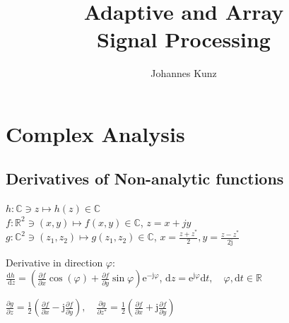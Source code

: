 \documentclass[english]{latex4ei/latex4ei_sheet}
\title{Adaptive and Array\\ Signal Processing}
\author{Johannes Kunz}					%
\begin{document}
\ifdefined\GitRevision{}\fi
\maketitle   %


\section{Complex Analysis}
\begin{sectionbox}
\subsection{Derivatives of Non-analytic functions}
\begin{emphbox}
  $h: \mathbb{C} \ni z \mapsto h(z) \in \mathbb{C}$\\
  $f: \mathbb{R}^{2} \ni(x, y) \mapsto f(x, y) \in \mathbb{C}$, $z=x+jy$\\
  $g: \mathbb{C}^{2} \ni\left(z_{1}, z_{2}\right) \mapsto g\left(z_{1}, z_{2}\right) \in \mathbb{C}$, $x=\frac{z+z^{*}}{2}, y=\frac{z-z^{*}}{2 \mathrm{j}}$
\end{emphbox}
Derivative in direction $\varphi$:\\
$\frac{\mathrm{d} h}{\mathrm{~d} z}=\left(\frac{\partial f}{\partial x} \cos (\varphi)+\frac{\partial f}{\partial y} \sin \varphi\right) \mathrm{e}^{-\mathrm{j} \varphi}$, $\mathrm{d} z=\mathrm{e}^{\mathrm{j} \varphi} \mathrm{d} t, \quad \varphi, \mathrm{d} t \in \mathbb{R}$\\
\begin{emphbox}
  $\frac{\partial g}{\partial z}=\frac{1}{2}\left(\frac{\partial f}{\partial x}-\mathrm{j} \frac{\partial f}{\partial y}\right), \quad \frac{\partial g}{\partial z^{*}}=\frac{1}{2}\left(\frac{\partial f}{\partial x}+\mathrm{j} \frac{\partial f}{\partial y}\right)$
\end{emphbox}

\end{sectionbox}
\end{document}
